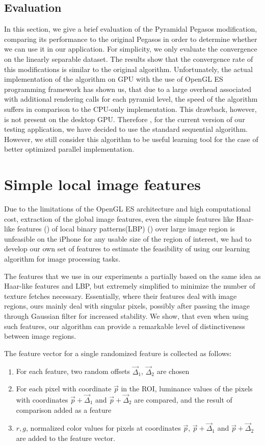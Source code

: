 \subsection{Evaluation}
In this section, we give a brief evaluation of the Pyramidal Pegasos modification, comparing its performance to the original Pegasos in order to determine whether we can use it in our application. For simplicity, we only evaluate the convergence on the linearly separable dataset. The results show that the convergence rate of this modifications is similar to the original algorithm. Unfortunately, the actual implementation of the algorithm on GPU with the use of OpenGL ES programming framework has shown us, that due to a large overhead associated with additional rendering calls for each pyramid level, the speed of the algorithm suffers in comparison to the CPU-only implementation. This drawback, however, is not present on the desktop GPU. Therefore , for the current version of our testing application, we have decided to use the standard sequential algorithm. However, we still consider this algorithm to be useful learning tool for the case of better optimized parallel implementation. 
\section{Simple local image features}

Due to the limitations of the OpenGL ES architecture and high computational cost, extraction of the global image features, even the simple features like Haar-like features (\cite{viola}) of local binary patterns(LBP) (\cite{LBP}) over large image region is unfeasible on the iPhone for any usable size of the region of interest, we had to develop our own set of features to estimate the feasibility of using our learning algorithm for image processing tasks.

The features that we use in our experiments a partially based on the same idea as Haar-like features and LBP, but extremely simplified to minimize the number of texture  fetches necessary. Essentially, where their features deal with image regions, ours mainly deal with singular pixels, possibly after passing the image through Gaussian filter for increased stability. We show, that even when using such features, our algorithm can provide a remarkable level of distinctiveness between image regions.

The feature vector for a single randomized feature is collected as follows:
\begin{enumerate}
\item For each feature, two random offsets $\vec{\Delta}_1$, $\vec{\Delta}_2$ are chosen
\item For each pixel with coordinate $\vec{p}$ in the ROI, luminance values of the pixels with coordinates $\vec{p}+\vec{\Delta}_1$ and $\vec{p}+\vec{\Delta}_2 $ are compared, and the result of comparison added as a feature
\item $r,g$, normalized color values for pixels at coordinates $\vec{p}$, $\vec{p}+\vec{\Delta}_1$ and $\vec{p}+\vec{\Delta}_2 $ are added to the feature vector.
\end{enumerate} 

